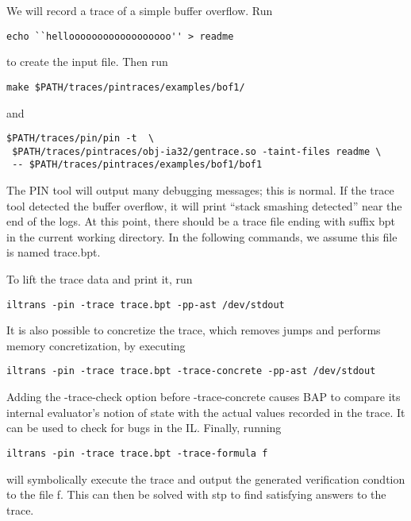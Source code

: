 We will record a trace of a simple buffer overflow.  Run 

\begin{verbatim}
echo ``helloooooooooooooooooo'' > readme
\end{verbatim}

 to create the input file.  Then run 

\begin{verbatim}
make $PATH/traces/pintraces/examples/bof1/
\end{verbatim}

and

\begin{verbatim}
$PATH/traces/pin/pin -t  \
 $PATH/traces/pintraces/obj-ia32/gentrace.so -taint-files readme \
 -- $PATH/traces/pintraces/examples/bof1/bof1
\end{verbatim}

The PIN tool will output
many debugging messages; this is normal.  If the trace tool detected
the buffer overflow, it will print ``stack smashing detected'' near
the end of the logs.  At this point, there should be a trace file
ending with suffix bpt in the current working directory.  In the
following commands, we assume this file is named trace.bpt.

To lift the trace data and print it, run 

\begin{verbatim}
iltrans -pin -trace trace.bpt -pp-ast /dev/stdout
\end{verbatim}

It is also possible to concretize the trace, which removes jumps and performs
memory concretization, by executing 

\begin{verbatim}
iltrans -pin -trace trace.bpt -trace-concrete -pp-ast /dev/stdout
\end{verbatim}

Adding the -trace-check option before -trace-concrete causes BAP to compare its
internal evaluator's notion of state with the actual values recorded in the
trace.  It can be used to check for bugs in the IL.  Finally, running 

\begin{verbatim}
iltrans -pin -trace trace.bpt -trace-formula f
\end{verbatim}

will symbolically execute the trace and output the generated verification
condtion to the file f. This can then be solved with stp to find satisfying
answers to the trace.
